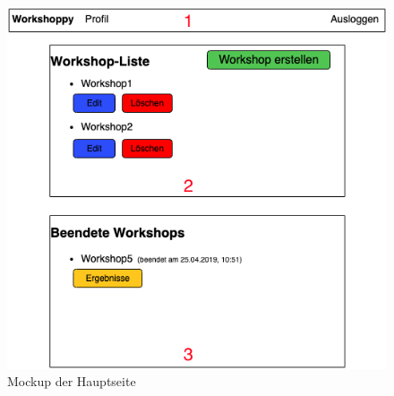 \begin{figure}[H]
  \begin{center}
    \includegraphics[scale=0.45]{img/hauptseite}
	\caption{Mockup der Hauptseite}  
	\label{fig:mockup für die hauptseite}
  \end{center}   
\end{figure}

